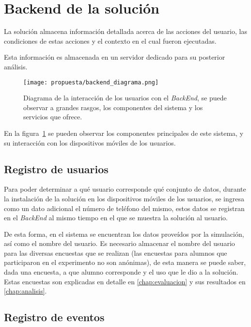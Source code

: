 \section{Backend de la solución}

La solución almacena información detallada acerca de las acciones del usuario,
las condiciones de estas acciones y el contexto en el cual fueron ejecutadas.

Esta información es almacenada en un servidor dedicado para su posterior
análisis.

\begin{figure}[ht]
\centering
\texttt{[image: propuesta/backend\_diagrama.png]}
\caption{Diagrama de la interacción de los usuarios con el \textit{BackEnd}, se
    puede observar a grandes rasgos, los componentes del sistema y los servicios
    que ofrece.}
\label{fig:backend_diagrama}
\end{figure}

En la figura~\ref{fig:backend_diagrama} se pueden observar los componentes
principales de este sistema, y su interacción con los dispositivos móviles de
los usuarios. 

\subsection{Registro de usuarios}

Para poder determinar a qué usuario corresponde qué conjunto de datos, durante la
instalación de la solución en los dispositivos móviles de los usuarios, se ingresa como
un dato adicional el número de teléfono del mismo, estos datos se registran
en el \textit{BackEnd} al mismo tiempo en el que se muestra la solución al usuario.

De esta forma, en el sistema se encuentran los datos proveídos por la
simulación, así como el nombre del usuario. Es necesario almacenar el nombre del
usuario para las diversas encuestas que se realizan (las encuestas para alumnos
que participaron en el experimento no son anónimas), de esta manera se puede
saber, dada una encuesta, a que alumno corresponde y el uso que le dio a la
solución. Estas encuestas son explicadas en detalle en \ref{chap:evaluacion} y sus 
resultados en \ref{chap:analisis}.

\subsection{Registro de eventos}

